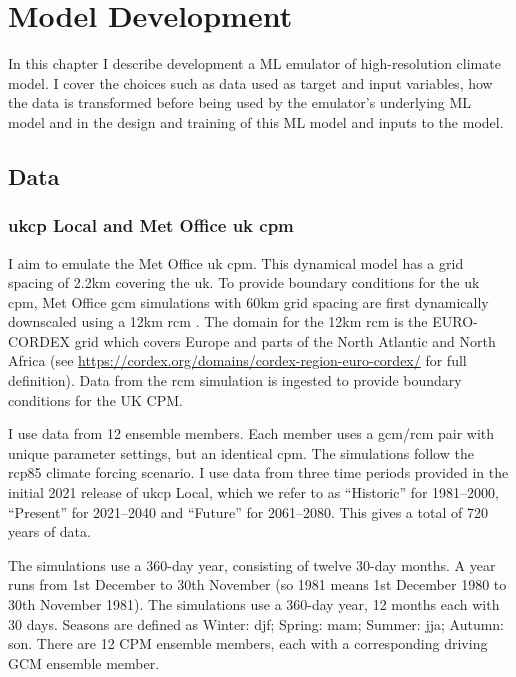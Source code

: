\chapter{Model Development}
\label{chap:model-dev}

In this chapter I describe development a ML emulator of high-resolution climate model.
I cover the choices such as data used as target and input variables, how the data is transformed before being used by the emulator's underlying ML model and in the design and training of this ML model and inputs to the model.

\section{Data}

\subsection{\acrshort{ukcp} Local and Met Office \acrshort{uk} \acrshort{cpm}}

I aim to emulate the Met Office \acrshort{uk} \acrshort{cpm}.
This dynamical model has a grid spacing of 2.2km covering the \acrshort{uk}.
To provide boundary conditions for the  \acrshort{uk} \acrshort{cpm}, Met Office \acrshort{gcm} simulations with 60km grid spacing are first dynamically downscaled using a 12km \acrshort{rcm} \parencite{kendon2021ukcpscienceupdate}. The domain for the 12km \acrshort{rcm} is the EURO-CORDEX grid \parencite{eurocordexdomain} which covers Europe and parts of the North Atlantic and North Africa (see \url{https://cordex.org/domains/cordex-region-euro-cordex/} for full definition). Data from the \acrshort{rcm} simulation is ingested to provide boundary conditions for the UK CPM.

I use data from 12 ensemble members. Each member uses a \acrshort{gcm}/\acrshort{rcm} pair with unique parameter settings, but an identical \acrshort{cpm}. The simulations follow the \acrfull{rcp85} climate forcing scenario. I use data from three time periods provided in the initial 2021 release of \acrshort{ukcp} Local, which we refer to as ``Historic'' for 1981--2000, ``Present'' for 2021--2040 and ``Future'' for 2061--2080. This gives a total of 720 years of data.

The simulations use a 360-day year, consisting of twelve 30-day months.
A year runs from 1st December to 30th November (so 1981 means 1st December 1980 to 30th November 1981). The simulations use a 360-day year, 12 months each with 30 days. Seasons are defined as Winter: \acrfull{djf}; Spring: \acrfull{mam}; Summer: \acrfull{jja}; Autumn: \acrfull{son}.
There are 12 CPM ensemble members, each with a corresponding driving GCM ensemble member.

